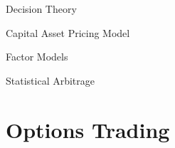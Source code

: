 \documentclass{beamer}
\begin{document}
\begin{frame}{Decision Theory}
\end{frame}

\begin{frame}{Capital Asset Pricing Model}
\end{frame}

\begin{frame}{Factor Models}
\end{frame}

\begin{frame}{Statistical Arbitrage}
\end{frame}

\section{Options Trading}

\end{document}
